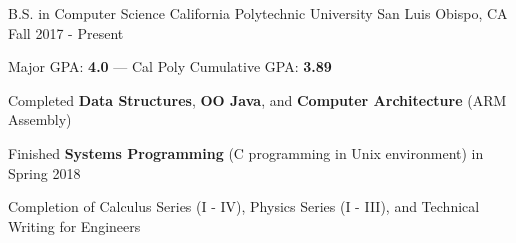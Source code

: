 

\begin{cventries}

  \cventry
    {B.S. in Computer Science} %
    {California Polytechnic University} %
    {San Luis Obispo, CA} %
    {Fall 2017 - Present} %
    {
      \begin{cvitems} %
        \item {Major GPA: \textbf{4.0} --- Cal Poly Cumulative GPA: \textbf{3.89}}
        \item {Completed \textbf{Data Structures}, \textbf{OO Java}, and \textbf{Computer Architecture} (ARM Assembly)}
        \item {Finished \textbf{Systems Programming} (C programming in Unix environment) in Spring 2018}
        \item {Completion of Calculus Series (I - IV), Physics Series (I - III), and Technical Writing for Engineers}
      \end{cvitems}
    }

\end{cventries}
